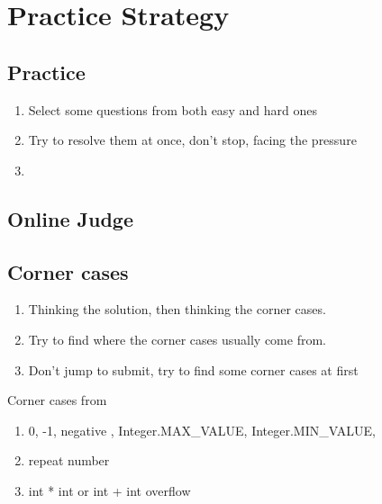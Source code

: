 \chapter{Practice Strategy}

\section{Practice }
\begin{enumerate}
    \item Select some questions from both easy and hard ones
    \item Try to resolve them at once, don't stop, facing the pressure
    \item
\end{enumerate}

\section{Online Judge }


\section{Corner cases     }

\begin{enumerate}
    \item Thinking the solution, then thinking the corner cases.
    \item Try to find where the corner cases usually come from.
    \item Don't jump to submit, try to find some corner cases at first
\end{enumerate}

Corner cases from

\begin{enumerate}
    \item  0, -1, negative , Integer.MAX\_VALUE, Integer.MIN\_VALUE,
    \item  repeat number
    \item  int * int or int + int overflow
\end{enumerate}


